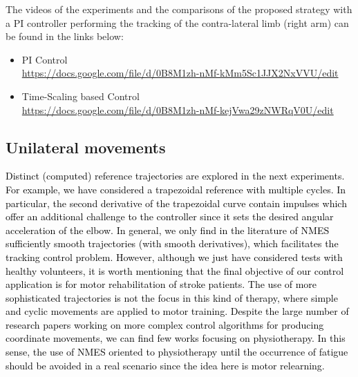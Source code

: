 \documentclass[review]{elsarticle}
\begin{document}
The videos of the experiments and the comparisons of the proposed strategy with a PI controller performing the tracking of the contra-lateral limb (right arm) can be found in the links below:
%
\begin{small}
\begin{itemize}
%
\item PI Control \\ \textcolor{blue}{\href{https://docs.google.com/file/d/0B8M1zh-nMf-kMm5Sc1JJX2NxVVU/edit}{https://docs.google.com/file/d/0B8M1zh-nMf-kMm5Sc1JJX2NxVVU/edit}} 
%
\medskip
%
\item Time-Scaling based Control \\ \textcolor{blue}{\href{https://docs.google.com/file/d/0B8M1zh-nMf-kejVwa29zNWRqV0U/edit}{https://docs.google.com/file/d/0B8M1zh-nMf-kejVwa29zNWRqV0U/edit}}\\
%
\end{itemize}
\end{small}


\subsection{Unilateral movements}

\textcolor{black}{Distinct (computed) reference trajectories are explored in the next experiments. For example, we have considered a trapezoidal reference with multiple cycles. In particular, the second derivative of the trapezoidal curve contain impulses which offer an \textcolor{black}{additional} challenge to the controller since it sets the desired angular acceleration of the elbow. In general, we only find in the literature of NMES sufficiently smooth trajectories (with smooth derivatives), which facilitates the tracking control problem. However, although we just have considered tests with healthy volunteers, it is worth mentioning that the final objective of our control application is for motor rehabilitation of stroke patients. The use of more sophisticated trajectories is not the focus in this kind of therapy, where simple and cyclic movements are applied to motor training. %
Despite the large number of research papers working on more complex control algorithms for producing coordinate movements, we can find few works focusing on physiotherapy. In this sense, the use of NMES oriented to physiotherapy until the occurrence of fatigue should be avoided in a real scenario since the idea here is motor relearning.}
\end{document}
